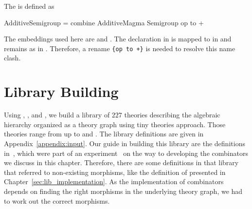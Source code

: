 The  is defined as 
\begin{togcode} 
AdditiveSemigroup = combine AdditiveMagma {} Semigroup {op to +} 
\end{togcode} 
The embeddings used here are  and . The declaration  in  is mapped to \lstmath{+} in  and remains as  in . Therefore, a rename \lstinline|{op to +}| is needed to resolve this name clash. 

\section{Library Building}
\label{sec:guidelines}
Using , , and , we build a library of $227$ theories describing the algebraic hierarchy organized as a theory graph using tiny theories approach. Those theories range from  up to  and  . The library definitions are given in Appendix~\ref{appendix:input}. 
Our guide in building this library are the definitions in~\cite{msLibDecls}, which were part of an experiment~\cite{mathscheme2011experiments} on the way to developing the combinators we discuss in this chapter. Therefore, there are some definitions in that library that referred to non-existing morphisms, like the definition of  presented in Chapter~\ref{sec:lib_implementation}. As the implementation of combinators depends on finding the right morphisms in the underlying theory graph, we had to work out the correct morphisms. 
 
